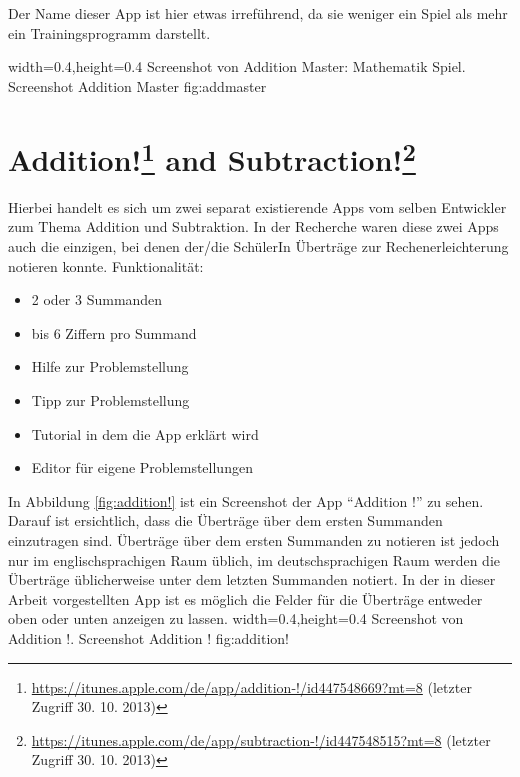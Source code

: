 Der Name dieser App ist hier etwas irreführend, da sie weniger ein Spiel als mehr ein Trainingsprogramm
darstellt.

  {width=0.4\textwidth,height=0.4\textheight}%
  {Screenshot von Addition Master: Mathematik Spiel.}%
  {Screenshot Addition Master}%
  {fig:addmaster}%



\section[Addition! and Subtraction!]{Addition!\footnote{\url{https://itunes.apple.com/de/app/addition-!/id447548669?mt=8} (letzter Zugriff 30. 10. 2013)} and Subtraction!\footnote{\url{https://itunes.apple.com/de/app/subtraction-!/id447548515?mt=8} (letzter Zugriff 30. 10. 2013)}}
Hierbei handelt es sich um zwei separat existierende Apps vom selben Entwickler zum Thema
Addition und Subtraktion. In der Recherche waren diese zwei Apps auch die einzigen, bei denen
der/die SchülerIn Überträge zur Rechenerleichterung notieren konnte.
Funktionalität:
\begin{itemize}
	\item 2 oder 3 Summanden
	\item bis 6 Ziffern pro Summand
	\item Hilfe zur Problemstellung
	\item Tipp zur Problemstellung
	\item Tutorial in dem die App erklärt wird
	\item Editor für eigene Problemstellungen
\end{itemize}
In Abbildung \ref{fig:addition!} ist ein Screenshot der App \enquote{Addition !} zu sehen. Darauf ist ersichtlich, dass
die Überträge über dem ersten Summanden einzutragen sind. Überträge über dem ersten Summanden
zu notieren ist jedoch nur im englischsprachigen Raum üblich, im deutschsprachigen Raum werden 
die Überträge üblicherweise unter dem letzten Summanden notiert. In der in dieser Arbeit vorgestellten
App ist es möglich die Felder für die Überträge entweder oben oder unten anzeigen zu lassen.
  {width=0.4\textwidth,height=0.4\textheight}%
  {Screenshot von Addition !.}%
  {Screenshot Addition !}%
  {fig:addition!}%

